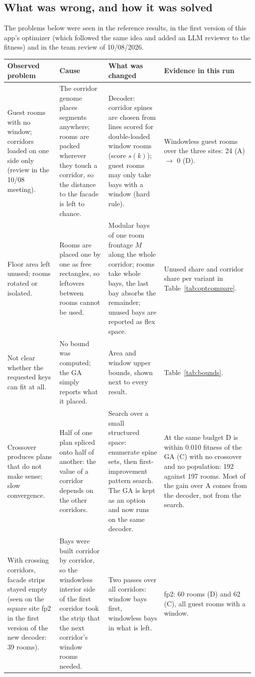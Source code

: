 \subsection{What was wrong, and how it was solved}
The problems below were seen in the reference results, in the first version of this app's optimizer (which followed the
same idea and added an LLM reviewer to the fitness) and in the team review of 10/08/2026.
{\footnotesize\begin{longtable}{p{3.13cm}p{3.52cm}p{4.66cm}p{3.42cm}}
\toprule
\textbf{Observed problem} & \textbf{Cause} & \textbf{What was changed} & \textbf{Evidence in this run} \\ \midrule \endhead
Guest rooms with no window; corridors loaded on one side only (review in the 10/08 meeting). & The corridor genome places segments anywhere; rooms are packed wherever they touch a corridor, so the distance to the facade is left to chance. & Decoder: corridor spines are chosen from lines scored for double-loaded window rooms (score $s(k)$); guest rooms may only take bays with a window (hard rule). & Windowless guest rooms over the three sites: 24 (A) $\to$ 0 (D). \\
Floor area left unused; rooms rotated or isolated. & Rooms are placed one by one as free rectangles, so leftovers between rooms cannot be used. & Modular bays of one room frontage $M$ along the whole corridor; rooms take whole bays, the last bay absorbs the remainder; unused bays are reported as flex space. & Unused share and corridor share per variant in Table~\ref{tab:optcompare}. \\
Not clear whether the requested keys can fit at all. & No bound was computed; the GA simply reports what it placed. & Area and window upper bounds, shown next to every result. & Table~\ref{tab:bounds}. \\
Crossover produces plans that do not make sense; slow convergence. & Half of one plan spliced onto half of another: the value of a corridor depends on the other corridors. & Search over a small structured space: enumerate spine sets, then first-improvement pattern search. The GA is kept as an option and now runs on the same decoder. & At the same budget D is within 0.010 fitness of the GA (C) with no crossover and no population: 192 against 197 rooms. Most of the gain over A comes from the decoder, not from the search. \\
With crossing corridors, facade strips stayed empty (seen on the square site fp2 in the first version of the new decoder: 39 rooms). & Bays were built corridor by corridor, so the windowless interior side of the first corridor took the strip that the next corridor's window rooms needed. & Two passes over all corridors: window bays first, windowless bays in what is left. & fp2: 60 rooms (D) and 62 (C), all guest rooms with a window. \\

\end{longtable}}

